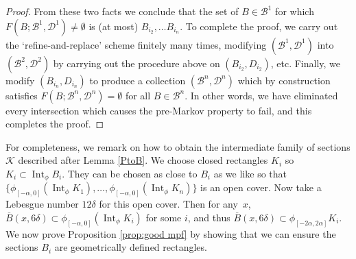 \documentclass[10pt]{amsart}
\let\mathcal\mathscr
\theoremstyle{definition}
\numberwithin{equation}{section}
\DeclareMathOperator{\Int}{Int}
\newcommand\KKK{\mathcal K}
\newcommand\BBB{\mathcal B}
\begin{document}
\begin{proof}
From these two facts we conclude that the set of $B\!\in\!\mathcal{B}^1$ for which \hbox{$F(B;\mathcal{B}^1,\mathcal{D}^1)\!\neq\!\emptyset$} is (at most) $B_{i_2}, \ldots B_{i_n}$. To complete the proof, we carry out the `refine-and-replace' scheme finitely many times, modifying $(\mathcal{B}^1, \mathcal{D}^1)$ into $(\mathcal{B}^2, \mathcal{D}^2)$ by carrying out the procedure above on $(B_{i_2}, D_{i_2})$, etc. Finally, we modify $(B_{i_n}, D_{i_n})$ to produce a collection $(\mathcal{B}^n, \mathcal{D}^n)$ which by construction satisfies $F(B; \mathcal{B}^n,\mathcal{D}^n) = \emptyset$ for all $B \in \BBB^n$. In other words, we have eliminated every intersection which causes the pre-Markov property to fail, and this completes the proof.
\end{proof}

For completeness, we remark on how to obtain the intermediate family of sections $\KKK$ described after Lemma \ref{PtoB}. We choose closed rectangles $K_i$ so $K_i \subset \Int_\phi B_i$. They can be chosen as close to $B_i$ as we like so that $\{\phi_{[-\alpha, 0]} (\Int_\phi K_1), \ldots, \phi_{[-\alpha, 0]} (\Int_\phi K_n)\}$ is an open cover. Now take a Lebesgue number $12 \delta$ for this open cover. Then for any~$x$, $\overline B(x, 6\delta) \subset \phi_{[-\alpha, 0]} (\Int_\phi K_i)$ for some $i$, and thus $\overline B(x, 6\delta) \subset \phi_{[-2 \alpha, 2 \alpha]}K_i$. We now prove Proposition \ref{prop:good mpf} by showing that we can ensure the sections $B_i$ are geometrically defined rectangles.
\end{document}
